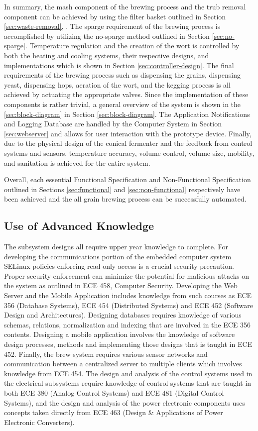 \documentclass{article}
\begin{document}
In summary, the \gls{mash} component of the brewing process and the \gls{trub} removal component can be achieved by using the filter basket outlined in Section \ref{sec:waste-removal}, .  The \gls{sparge} requirement of the brewing process is accomplished by utilizing the no-sparge method outlined in Section \ref{sec:no-sparge}.  Temperature regulation and the creation of the \gls{wort} is controlled by both the heating and cooling systems, their respective designs, and implementations which is shown in Section \ref{sec:controller-design}.  The final requirements of the brewing process such as dispensing the grains, dispensing yeast, dispensing hops, aeration of the \gls{wort}, and the kegging process is all achieved by actuating the appropriate valves.  Since the implementation of these components is rather trivial, a general overview of the system is shown in the \ref{sec:block-diagram} in Section \ref{sec:block-diagram}.  The Application Notifications and Logging Database are handled by the Computer System in Section \ref{sec:webserver} and allows for user interaction with the prototype device.  Finally, due to the physical design of the conical fermenter and the feedback from control systems and sensors, temperature accuracy, volume control, volume size, mobility, and sanitation is achieved for the entire system.

Overall, each essential Functional Specification and Non-Functional Specification outlined in Sections \ref{sec:functional} and \ref{sec:non-functional} respectively have been achieved and the all grain brewing process can be successfully automated.
\subsection{Use of Advanced Knowledge}
The subsystem designs all require upper year knowledge to complete. For developing the communications portion of the embedded computer system SELinux policies enforcing read only access is a crucial security precaution.  Proper security enforcement can minimize the potential for malicious attacks on the system as outlined in ECE 458, Computer Security.  Developing the Web Server and the Mobile Application includes knowledge from such courses as ECE 356 (Database Systems), ECE 454 (Distributed Systems) and ECE 452 (Software Design and Architectures). Designing databases requires knowledge of various schemas, relations, normalization and indexing that are involved in the ECE 356 contents. Designing a mobile application involves the knowledge of software design processes, methods and implementing those designs that is taught in ECE 452. Finally, the brew system requires various sensor networks and communication between a centralized server to multiple clients which involves knowledge from ECE 454. The design and analysis of the control systems used in the electrical subsystems require knowledge of control systems that are taught in both ECE 380 (Analog Control Systems) and ECE 481 (Digital Control Systems), and the design and analysis of the power electronic components uses concepts taken directly from ECE 463 (Design \& Applications of Power Electronic Converters).
\end{document}
